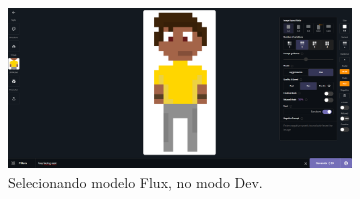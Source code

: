\begin{figure}[htbp]
    \centering
    \caption{\small Processo da utilização 1 do CGDream (Imagem)}
    \label{fig:cgDream1}
    \begin{subfigure}{1\linewidth}
        \includegraphics[width=1\linewidth]{figs/cgDream/tela_img_fluxDev.PNG}
        \caption{\small Selecionando modelo Flux, no modo Dev.}
        \label{fig:cgDream1a}
    \end{subfigure}
    \begin{subfigure}{0.25\linewidth}

\end{subfigure}
\end{figure}
